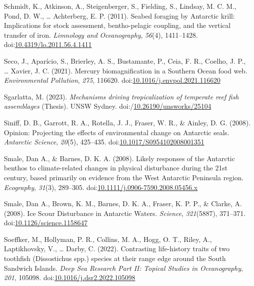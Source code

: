 \documentclass[
]{article}
\newlength{\cslhangindent}
\newlength{\cslentryspacingunit} %
\newenvironment{CSLReferences}[2] %
 {%
  \setlength{\parindent}{0pt}
  \ifodd #1
  \let\oldpar\par
  \def\par{\hangindent=\cslhangindent\oldpar}
  \fi
  \setlength{\parskip}{#2\cslentryspacingunit}
 }%
 {}
\begin{document}
\begin{CSLReferences}{1}{0}
\leavevmode{}%
Schmidt, K., Atkinson, A., Steigenberger, S., Fielding, S., Lindsay, M.
C. M., Pond, D. W., \ldots{} Achterberg, E. P. (2011). Seabed foraging
by {Antarctic} krill: {Implications} for stock assessment,
bentho-pelagic coupling, and the vertical transfer of iron.
\emph{Limnology and Oceanography}, \emph{56}(4), 1411--1428.
doi:\href{https://doi.org/10.4319/lo.2011.56.4.1411}{10.4319/lo.2011.56.4.1411}

\leavevmode{}%
Seco, J., Aparício, S., Brierley, A. S., Bustamante, P., Ceia, F. R.,
Coelho, J. P., \ldots{} Xavier, J. C. (2021). Mercury biomagnification
in a {Southern Ocean} food web. \emph{Environmental Pollution},
\emph{275}, 116620.
doi:\href{https://doi.org/10.1016/j.envpol.2021.116620}{10.1016/j.envpol.2021.116620}

\leavevmode{}%
Sgarlatta, M. (2023). \emph{Mechanisms driving tropicalization of
temperate reef fish assemblages} (Thesis). UNSW Sydney.
doi:/\href{https://doi.org/10.26190/unsworks/25104}{10.26190/unsworks/25104}

\leavevmode{}%
Siniff, D. B., Garrott, R. A., Rotella, J. J., Fraser, W. R., \& Ainley,
D. G. (2008). Opinion: {Projecting} the effects of environmental change
on {Antarctic} seals. \emph{Antarctic Science}, \emph{20}(5), 425--435.
doi:\href{https://doi.org/10.1017/S0954102008001351}{10.1017/S0954102008001351}

\leavevmode{}%
Smale, Dan A., \& Barnes, D. K. A. (2008). Likely responses of the
{Antarctic} benthos to climate-related changes in physical disturbance
during the 21st century, based primarily on evidence from the {West
Antarctic Peninsula} region. \emph{Ecography}, \emph{31}(3), 289--305.
doi:\href{https://doi.org/10.1111/j.0906-7590.2008.05456.x}{10.1111/j.0906-7590.2008.05456.x}

\leavevmode{}%
Smale, Dan A., Brown, K. M., Barnes, D. K. A., Fraser, K. P. P., \&
Clarke, A. (2008). Ice {Scour Disturbance} in {Antarctic Waters}.
\emph{Science}, \emph{321}(5887), 371--371.
doi:\href{https://doi.org/10.1126/science.1158647}{10.1126/science.1158647}

\leavevmode{}%
Soeffker, M., Hollyman, P. R., Collins, M. A., Hogg, O. T., Riley, A.,
Laptikhovsky, V., \ldots{} Darby, C. (2022). Contrasting life-history
traits of two toothfish ({Dissostichus} spp.) species at their range
edge around the {South Sandwich Islands}. \emph{Deep Sea Research Part
II: Topical Studies in Oceanography}, \emph{201}, 105098.
doi:\href{https://doi.org/10.1016/j.dsr2.2022.105098}{10.1016/j.dsr2.2022.105098}


\end{CSLReferences}
\end{document}

